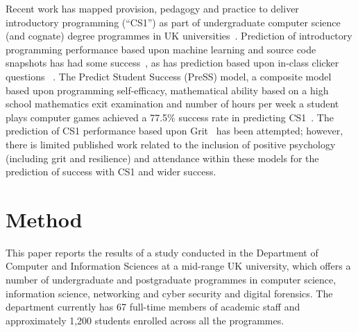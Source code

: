 \documentclass[sigconf]{acmart}
\begin{document}
Recent work has mapped provision, pedagogy and practice to deliver introductory programming (``CS1'') as part of undergraduate computer science (and cognate) degree programmes in UK universities~\cite{davenport-et-al:latice2016,murphy-et-al:programming2017,simon-et-al:sigcse2018}. Prediction of introductory programming performance based upon machine learning and source code snapshots has had some success~\cite{Ahadi:2015:EML:2787622.2787717,Castro-Wunsch:2017:ENN:3017680.3017792}, as has prediction based upon in-class clicker questions ~\cite{Liao:2016:LEI:2960310.2960315,Liao:2019:RML:3308443.3277569}. The Predict Student Success (PreSS) model, a composite model based upon programming self-efficacy, mathematical ability based on a high school mathematics exit examination and number of hours per week a student plays computer games achieved a 77.5\% success rate in predicting CS1~\cite{Quille:2018:PPS:3197091.3197101}. The prediction of CS1 performance based upon Grit~\cite{Sigurdson:2018:EGC:3279720.3279743} has been attempted; however, there is limited published work related to the inclusion of positive psychology (including grit and resilience) and attendance within these models for the prediction of success with CS1 and wider success.


\section {Method}
This paper reports the results of a study conducted in the Department of Computer and Information Sciences at a mid-range UK university, which offers a number of undergraduate and postgraduate programmes in computer science, information science, networking and cyber security and digital forensics. The department currently has 67 full-time members of academic staff and approximately 1,200 students enrolled across all the programmes.
\end{document}
